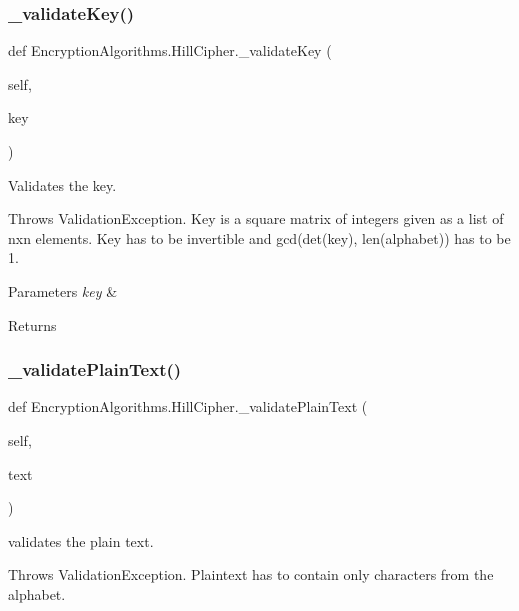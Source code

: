 \subsubsection{\texorpdfstring{\+\_\+validate\+Key()}{\_validateKey()}}
{\footnotesize\ttfamily def Encryption\+Algorithms.\+Hill\+Cipher.\+\_\+validate\+Key (\begin{DoxyParamCaption}\item[{}]{self,  }\item[{}]{key }\end{DoxyParamCaption})\hspace{0.3cm}{\ttfamily [private]}}



Validates the key. 

Throws Validation\+Exception. Key is a square matrix of integers given as a list of nxn elements. Key has to be invertible and gcd(det(key), len(alphabet)) has to be 1. 
\begin{DoxyParams}{Parameters}
{\em key} & \\
\hline
\end{DoxyParams}
\begin{DoxyReturn}{Returns}

\end{DoxyReturn}
\mbox{\label{classEncryptionAlgorithms_1_1HillCipher_a3a9607e614402c2d7daa85d074b44a05}} 
\subsubsection{\texorpdfstring{\+\_\+validate\+Plain\+Text()}{\_validatePlainText()}}
{\footnotesize\ttfamily def Encryption\+Algorithms.\+Hill\+Cipher.\+\_\+validate\+Plain\+Text (\begin{DoxyParamCaption}\item[{}]{self,  }\item[{}]{text }\end{DoxyParamCaption})\hspace{0.3cm}{\ttfamily [private]}}



validates the plain text. 

Throws Validation\+Exception. Plaintext has to contain only characters from the alphabet.


